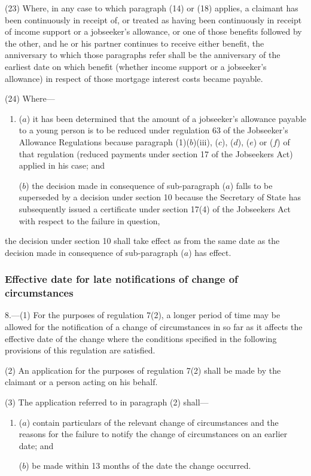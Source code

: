 \documentclass[12pt,a4paper]{article}
\begin{document}
(23) Where, in any case to which paragraph (14) or (18) applies, a claimant has been continuously in receipt of, or treated as having been continuously in receipt of income support or a jobseeker’s allowance, or one of those benefits followed by the other, and he or his partner continues to receive either benefit, the anniversary to which those paragraphs refer shall be the anniversary of the earliest date on which benefit (whether income support or a jobseeker’s allowance) in respect of those mortgage interest costs became payable.

(24) Where—
\begin{enumerate}\item[]
($a$) it has been determined that the amount of a jobseeker’s allowance payable to a young person is to be reduced under regulation 63 of the Jobseeker’s Allowance Regulations because paragraph (1)($b$)(iii), ($c$), ($d$), ($e$) or ($f$) of that regulation (reduced payments under section 17 of the Jobseekers Act) applied in his case; and

($b$) the decision made in consequence of sub-paragraph ($a$) falls to be superseded by a decision under section 10 because the Secretary of State has subsequently issued a certificate under section 17(4) of the Jobseekers Act with respect to the failure in question,
\end{enumerate}
the decision under section 10 shall take effect as from the same date as the decision made in consequence of sub-paragraph ($a$) has effect.

\subsubsection[8. Effective date for late notifications of change of circumstances]{Effective date for late notifications of change of circumstances}

8.—(1) For the purposes of regulation 7(2), a longer period of time may be allowed for the notification of a change of circumstances in so far as it affects the effective date of the change where the conditions specified in the following provisions of this regulation are satisfied.

(2) An application for the purposes of regulation 7(2) shall be made by the claimant or a person acting on his behalf.

(3) The application referred to in paragraph (2) shall—
\begin{enumerate}\item[]
($a$) contain particulars of the relevant change of circumstances and the reasons for the failure to notify the change of circumstances on an earlier date; and

($b$) be made within 13 months of the date the change occurred.
\end{enumerate}
\end{document}
